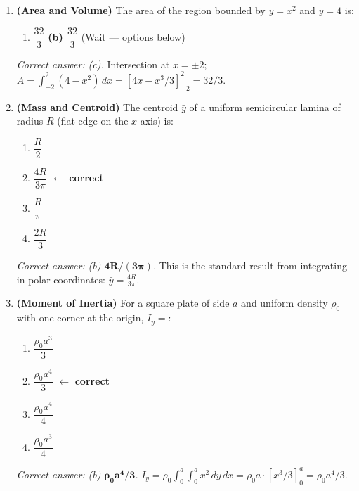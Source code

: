 \documentclass[12pt,a4paper]{article}
\begin{document}
\begin{enumerate}[label=\textbf{MCQ\arabic*.}]

  \item \textbf{(Area and Volume)} The area of the region bounded by \(y = x^2\) and \(y = 4\) is:
  \begin{enumerate}[label=(\alph*)]
    \item \(\dfrac{32}{3}\) \quad \textbf{(b) \(\dfrac{32}{3}\)} \quad (Wait --- options below)
  \end{enumerate}
  \textit{Correct answer: (c).} Intersection at \(x = \pm2\); \(A = \int_{-2}^{2}(4-x^2)\,dx = [4x - x^3/3]_{-2}^{2} = 32/3\).

  \item \textbf{(Mass and Centroid)} The centroid \(\bar{y}\) of a uniform semicircular lamina of radius \(R\) (flat edge on the \(x\)-axis) is:
  \begin{enumerate}[label=(\alph*)]
    \item \(\dfrac{R}{2}\)
    \item \(\dfrac{4R}{3\pi}\)  \quad \(\leftarrow\) \textbf{correct}
    \item \(\dfrac{R}{\pi}\)
    \item \(\dfrac{2R}{3}\)
  \end{enumerate}
  \textit{Correct answer: (b) \(\mathbf{4R/(3\pi)}\).} This is the standard result from integrating in polar coordinates: \(\bar{y} = \tfrac{4R}{3\pi}\).

  \item \textbf{(Moment of Inertia)} For a square plate of side \(a\) and uniform density \(\rho_0\) with one corner at the origin, \(I_y = \):
  \begin{enumerate}[label=(\alph*)]
    \item \(\dfrac{\rho_0 a^3}{3}\)
    \item \(\dfrac{\rho_0 a^4}{3}\)  \quad \(\leftarrow\) \textbf{correct}
    \item \(\dfrac{\rho_0 a^4}{4}\)
    \item \(\dfrac{\rho_0 a^3}{4}\)
  \end{enumerate}
  \textit{Correct answer: (b) \(\mathbf{\rho_0 a^4/3}\).} \(I_y = \rho_0 \int_0^a\int_0^a x^2\,dy\,dx = \rho_0 a \cdot [x^3/3]_0^a = \rho_0 a^4/3\).


\end{enumerate}
\end{document}
